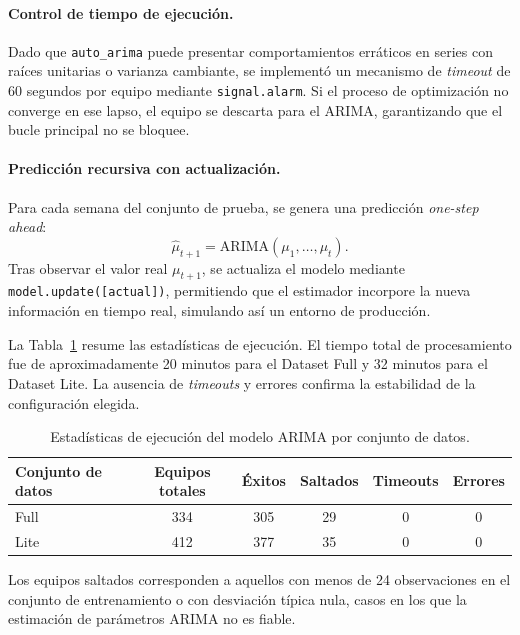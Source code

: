 \paragraph{Control de tiempo de ejecuci\'on.} 
Dado que \texttt{auto\_arima} puede presentar comportamientos err\'aticos en series con ra\'ices unitarias o varianza cambiante, se implement\'o un mecanismo de \textit{timeout} de 60 segundos por equipo mediante \texttt{signal.alarm}. Si el proceso de optimizaci\'on no converge en ese lapso, el equipo se descarta para el ARIMA, garantizando que el bucle principal no se bloquee.

\paragraph{Predicci\'on recursiva con actualizaci\'on.}
Para cada semana del conjunto de prueba, se genera una predicci\'on \textit{one-step ahead}:
\[
\hat{\mu}_{t+1} = \text{ARIMA}( \mu_1, \dots, \mu_t ).
\]
Tras observar el valor real \(\mu_{t+1}\), se actualiza el modelo mediante \texttt{model.update([actual])}, permitiendo que el estimador incorpore la nueva informaci\'on en tiempo real, simulando as\'i un entorno de producci\'on.

La Tabla~\ref{tab:arima_ejecucion} resume las estad\'isticas de ejecuci\'on. El tiempo total de procesamiento fue de aproximadamente 20 minutos para el Dataset Full y 32 minutos para el Dataset Lite. La ausencia de \textit{timeouts} y errores confirma la estabilidad de la configuraci\'on elegida.

\begin{table}[htbp]
	\centering
	\caption{Estad\'isticas de ejecuci\'on del modelo ARIMA por conjunto de datos.}
	\label{tab:arima_ejecucion}
	\begin{tabular}{lccccc}
		\toprule
		\textbf{Conjunto de datos} & \textbf{Equipos totales} & \textbf{\'Exitos} & \textbf{Saltados} & \textbf{Timeouts} & \textbf{Errores} \\
		\midrule
		Full            & 334 & 305 & 29 & 0 & 0 \\
		Lite            & 412 & 377 & 35 & 0 & 0 \\
		\bottomrule
	\end{tabular}
\end{table}

Los equipos saltados corresponden a aquellos con menos de 24 observaciones en el conjunto de entrenamiento o con desviaci\'on t\'ipica nula, casos en los que la estimaci\'on de par\'ametros ARIMA no es fiable.

